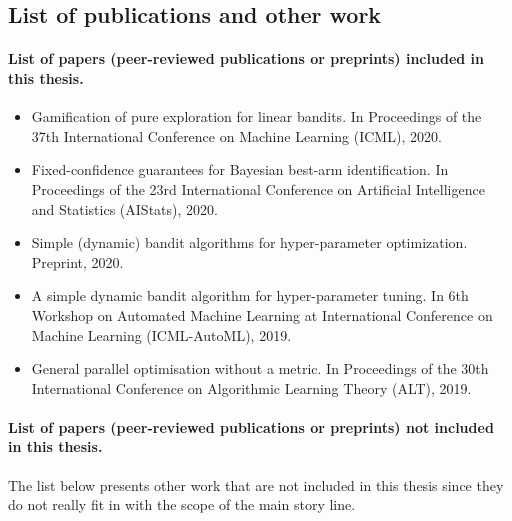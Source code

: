 \subsection{List of publications and other work}\label{sec:intro.contributions.list}

\paragraph{List of papers (peer-reviewed publications or preprints) included in this thesis.}

\begin{itemize}[label=]
    \item Gamification of pure exploration for linear bandits. In Proceedings of the 37th International Conference on Machine Learning (ICML), 2020.~\citep{degenne2020game}
    \item Fixed-confidence guarantees for Bayesian best-arm identification. In Proceedings of the 23rd International Conference on Artificial Intelligence and Statistics (AIStats), 2020.\citep{shang2020t3c}
    \item Simple (dynamic) bandit algorithms for hyper-parameter optimization. Preprint, 2020.~\citep{shang2020dttts}
    \item A simple dynamic bandit algorithm for hyper-parameter tuning. In 6th Workshop on Automated Machine Learning at International Conference on Machine Learning (ICML-AutoML), 2019.~\citep{shang2019dttts}
    \item General parallel optimisation without a metric. In Proceedings of the 30th International Conference on Algorithmic Learning Theory (ALT), 2019.~\citep{shang2019adaptive}
\end{itemize}

\paragraph{List of papers (peer-reviewed publications or preprints) not included in this thesis.}

The list below presents other work that are not included in this thesis since they do not really fit in with the scope of the main story line.

